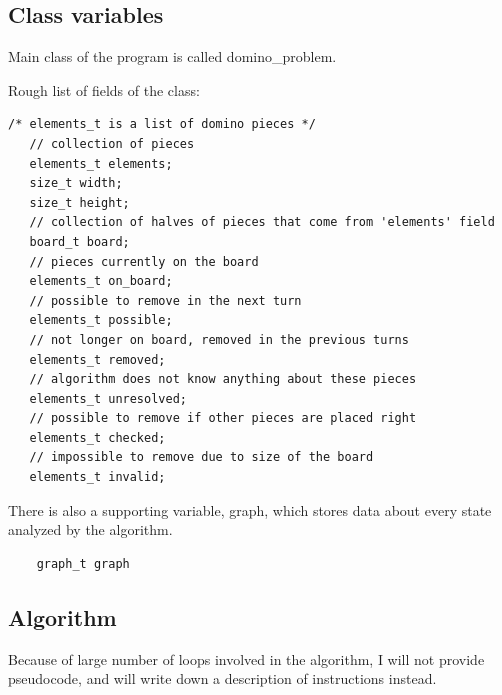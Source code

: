 \documentclass{article}
\begin{document}
\subsection{Class variables}
Main class of the program is called domino\_problem.

Rough list of fields of the class:
\begin{verbatim}
/* elements_t is a list of domino pieces */
   // collection of pieces
   elements_t elements;
   size_t width;
   size_t height;
   // collection of halves of pieces that come from 'elements' field
   board_t board;
   // pieces currently on the board
   elements_t on_board;
   // possible to remove in the next turn
   elements_t possible;
   // not longer on board, removed in the previous turns
   elements_t removed;
   // algorithm does not know anything about these pieces
   elements_t unresolved;
   // possible to remove if other pieces are placed right
   elements_t checked;
   // impossible to remove due to size of the board
   elements_t invalid;
\end{verbatim}

There is also a supporting variable, graph, which stores data about every state analyzed by the
algorithm.
\begin{verbatim}
	graph_t graph
\end{verbatim}

\subsection{Algorithm}
Because of large number of loops involved in the algorithm, 
I will not provide pseudocode, and will write down 
a description of instructions instead.
\end{document}
